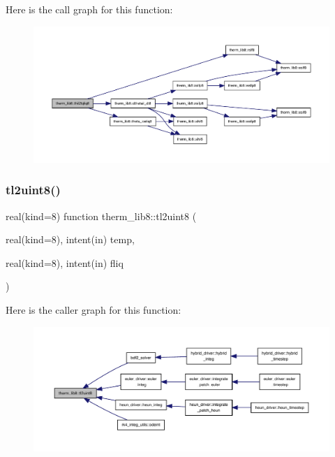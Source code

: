 Here is the call graph for this function\+:
\nopagebreak
\begin{figure}[H]
\begin{center}
\leavevmode
\includegraphics[width=350pt]{namespacetherm__lib8_aec7ba278ae89d43e89ab00a29a825416_cgraph}
\end{center}
\end{figure}
\mbox{\label{namespacetherm__lib8_afb21e6b55b53bbc124c228e01ccc60cb}} 
\subsubsection{\texorpdfstring{tl2uint8()}{tl2uint8()}}
{\footnotesize\ttfamily real(kind=8) function therm\+\_\+lib8\+::tl2uint8 (\begin{DoxyParamCaption}\item[{real(kind=8), intent(in)}]{temp,  }\item[{real(kind=8), intent(in)}]{fliq }\end{DoxyParamCaption})}

Here is the caller graph for this function\+:
\nopagebreak
\begin{figure}[H]
\begin{center}
\leavevmode
\includegraphics[width=350pt]{namespacetherm__lib8_afb21e6b55b53bbc124c228e01ccc60cb_icgraph}
\end{center}
\end{figure}
\mbox{\label{namespacetherm__lib8_abc11d3a9518a513fd0b3b97e6fc0e68e}} 
